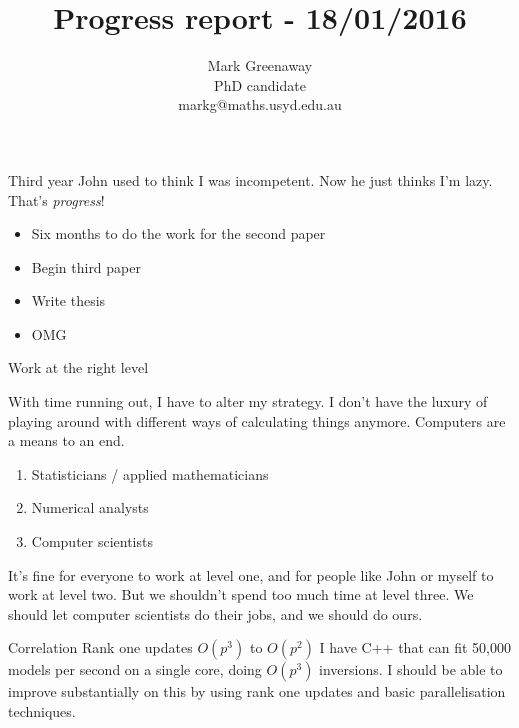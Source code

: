 \documentclass{beamer}
\title{Progress report - 18/01/2016}
\author{Mark Greenaway\\PhD candidate\\markg@maths.usyd.edu.au}
\begin{document}
\begin{frame}
\maketitle
\end{frame}

\begin{frame}{Third year}
John used to think I was incompetent. Now he just thinks I'm lazy. That's \emph{progress}!
\begin{itemize}
\item Six months to do the work for the second paper
\item Begin third paper
\item Write thesis
\item OMG
\end{itemize}
\end{frame}

\begin{frame}{Work at the right level}

With time running out, I have to alter my strategy. I don't have the luxury of
playing around with different ways of calculating things anymore. Computers
are a means to an end.

\begin{enumerate}
\item Statisticians / applied mathematicians
\item Numerical analysts
\item Computer scientists
\end{enumerate}

It's fine for everyone to work at level one, and for people like John or
myself to work at level two. But we shouldn't spend too much time at level
three. We should let computer scientists do their jobs, and we should do ours.

\end{frame}

\begin{frame}{Correlation}
Rank one updates
$O(p^3)$ to $O(p^2)$
I have C++ that can fit 50,000 models per second on a single core, doing $O(p^3)$ inversions. I should
be able to improve substantially on this by using rank one updates and basic parallelisation 
techniques.
\end{frame}
\end{document}
